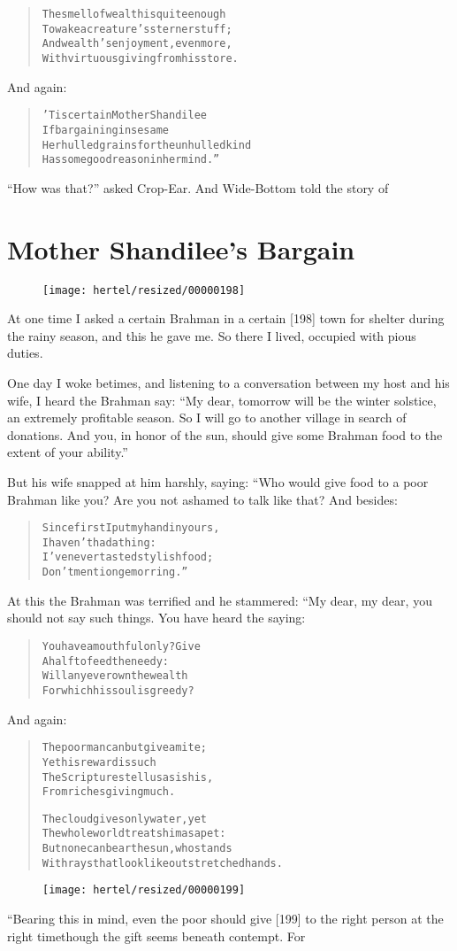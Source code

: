 \documentclass[article, twoside, 10pt]{memoir}
\renewenvironment{verbatim}{%
\begin{quote}%
\vskip -10pt%
\begin{alltt}\normalfont\small}{\end{alltt}%
\end{quote}%
\vskip -10pt
} %
\begin{document}
\begin{verbatim}
The smell of wealth is quite enough
To wake a creature's sterner stuff;
And wealth's enjoyment, even more,
With virtuous giving from his store.
\end{verbatim}
And again:

\begin{verbatim}
'Tis certain Mother Shandilee
If bargaining in sesame{\textemdash}
Her hulled grains for the unhulled kind{\textemdash}
Has some good reason in her mind.”
\end{verbatim}
``How was that?'' asked Crop-Ear. And Wide-Bottom told the story
of

\chapter{Mother Shandilee's Bargain}

\begin{figure}[p]\texttt{[image: hertel/resized/00000198]}\end{figure}At one time I asked a certain Brahman in a certain [198] town for
shelter during the rainy season, and this he gave me. So there I
lived, occupied with pious duties.

One day I woke betimes, and listening to a conversation between my
host and his wife, I heard the Brahman say:
``My dear, tomorrow will be the winter solstice, an extremely profitable season. So I will go to another village in search of donations. And you, in honor of the sun, should give some Brahman food to the extent of your ability.''

But his wife snapped at him harshly, saying: “Who would give food
to a poor Brahman like you? Are you not ashamed to talk like that?
And besides:

\begin{verbatim}
Since first I put my hand in yours,
    I haven't had a thing:
I've never tasted stylish food;
    Don't mention gem or ring.”
\end{verbatim}
At this the Brahman was terrified and he stammered: “My dear, my
dear, you should not say such things. You have heard the saying:

\begin{verbatim}
You have a mouthful only? Give
    A half to feed the needy:
Will any ever own the wealth
    For which his soul is greedy?
\end{verbatim}
And again:

\begin{verbatim}
The poor man can but give a mite;
    Yet his reward is such{\textemdash}
The Scriptures tell us{\textemdash}as is his,
    From riches giving much.

The cloud gives only water, yet
The whole world treats him as a pet:
But none can bear the sun, who stands
With rays that look like outstretched hands.
\end{verbatim}
\begin{figure}[p]\texttt{[image: hertel/resized/00000199]}\end{figure}“Bearing this in mind, even the poor should give [199] to the right
person at the right time{\textemdash}though the gift seems beneath contempt.
For
\end{document}
